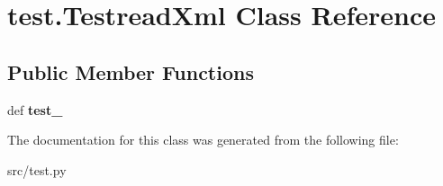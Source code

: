 \hypertarget{classtest_1_1_testread_xml}{\section{test.\-Testread\-Xml \-Class \-Reference}
\label{classtest_1_1_testread_xml}
}
\subsection*{\-Public \-Member \-Functions}
\begin{DoxyCompactItemize}
\item 
\hypertarget{classtest_1_1_testread_xml_a15f08f56300089e6c9e4e5fe533179cf}{def {\bfseries test\-\_\-}}\label{classtest_1_1_testread_xml_a15f08f56300089e6c9e4e5fe533179cf}

\end{DoxyCompactItemize}


\-The documentation for this class was generated from the following file\-:\begin{DoxyCompactItemize}
\item 
src/test.\-py\end{DoxyCompactItemize}
